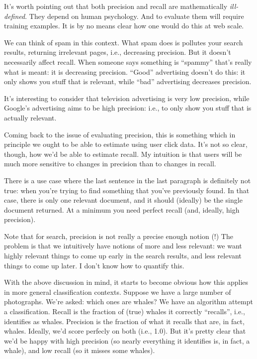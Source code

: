 It's worth pointing out that both precision and recall are
mathematically \emph{ill-defined}.  They depend on human psychology.
And to evaluate them will require training examples.  It is by no
means clear how one would do this at web scale.

We can think of spam in this context.  What spam does is pollutes your
search results, returning irrelevant pages, i.e., decreasing
precision.  But it doesn't necessarily affect recall.  When someone
says something is ``spammy'' that's really what is meant: it is
decreasing precision.  ``Good'' advertising doesn't do this: it only
shows you stuff that is relevant, while ``bad'' advertising decreases
precision.

It's interesting to consider that television advertising is very low
precision, while Google's advertising aims to be high precision: i.e.,
to only show you stuff that is actually relevant.

Coming back to the issue of evaluating precision, this is something
which in principle we ought to be able to estimate using user click
data.  It's not so clear, though, how we'd be able to estimate recall.
My intuition is that users will be much more sensitive to changes in
precision than to changes in recall.  

There is a use case where the last sentence in the last paragraph is
definitely not true: when you're trying to find something that you've
previously found.  In that case, there is only one relevant document,
and it should (ideally) be the single document returned.  At a minimum
you need perfect recall (and, ideally, high precision).

Note that for search, precision is not really a precise enough notion
(!)  The problem is that we intuitively have notions of more and less
relevant: we want highly relevant things to come up early in the
search results, and less relevant things to come up later.  I don't
know how to quantify this.

With the above discussion in mind, it starts to become obvious how
this applies in more general classification contexts.  Suppose we have
a large number of photographs.  We're asked: which ones are whales?
We have an algorithm attempt a classification.  Recall is the fraction
of (true) whales it correctly ``recalls'', i.e., identifies as whales.
Precision is the fraction of what it recalls that are, in fact,
whales.  Ideally, we'd score perfecly on both (i.e., 1.0).  But it's
pretty clear that we'd be happy with high precision (so nearly
everything it identifies is, in fact, a whale), and low recall (so it
misses some whales).

